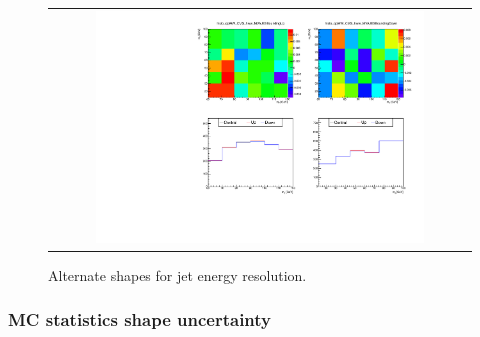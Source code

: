 %
\begin{figure}[htp]
\centering
\begin{tabular}{c}
\includegraphics[width=0.8\textwidth]{figures/histo_qqWW_CMS_hww_MVAJESBounding_0j_zoom.pdf}
\end{tabular}
\caption{Alternate shapes for jet energy resolution.}
\label{fig:alter_jes}
\end{figure}

\subsubsection{MC statistics shape uncertainty} 

